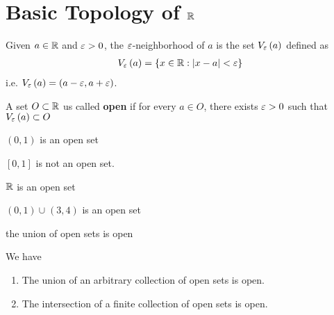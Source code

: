 
\section{Basic Topology of $\mathbb{R}$}

\begin{definition}
	Given $a \in \mathbb{R}$ and $\e > 0$, the $\e$-neighborhood of  $a$ is the set $V_{\e}\left( a \right) $ defined as
	\begin{align}
		V_{\e}\left( a \right) = \{x \in \R : \left|x - a\right| < \e\} 
	\end{align}
	i.e. $V_{\e}\left( a \right) = \left( a - \e, a + \e \right) $.
\end{definition}

\begin{definition}
	A set $O \subset  \mathbb{R}$ us called  \textbf{open} if for every $a \in O$, there exists $\e > 0$ such that $V_{\e}\left( a \right) \subset O$
\end{definition}

\begin{eg}
	$\left( 0, 1 \right) $ is an open set

	$[0, 1]$ is not an open set.

	$\mathbb{R}$ is an open set

	$\left( 0, 1 \right) \cup_{}^{} \left( 3, 4 \right) $ is an open set
	\begin{note}
		the union of open sets is open
	\end{note}
\end{eg}

\begin{theorem}
	We have
	\begin{enumerate}
		\item The union of an arbitrary collection of open sets is open.
		\item The intersection of a finite collection of open sets is open.
	\end{enumerate}
\end{theorem}

